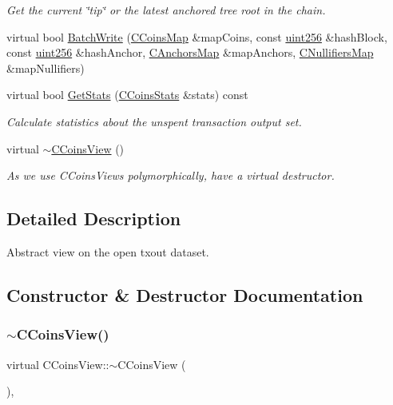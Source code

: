 \begin{DoxyCompactItemize}
\begin{DoxyCompactList}\small\item\em Get the current \char`\"{}tip\char`\"{} or the latest anchored tree root in the chain. \end{DoxyCompactList}\item 
virtual bool \mbox{\hyperlink{class_c_coins_view_a6e0ef2f996f5bf9f15c4fcae89333c7d}{Batch\+Write}} (\mbox{\hyperlink{coins_8h_a2886ba2fd0428bae777e1cbcabc02834}{C\+Coins\+Map}} \&map\+Coins, const \mbox{\hyperlink{classuint256}{uint256}} \&hash\+Block, const \mbox{\hyperlink{classuint256}{uint256}} \&hash\+Anchor, \mbox{\hyperlink{coins_8h_a070827cc9d21a91b8f4f4f52a6f7c848}{C\+Anchors\+Map}} \&map\+Anchors, \mbox{\hyperlink{coins_8h_ab651cc287e9594190ef77d2fca2b14c7}{C\+Nullifiers\+Map}} \&map\+Nullifiers)
\item 
virtual bool \mbox{\hyperlink{class_c_coins_view_adbd7f73ba071c6e441dd88d95b8f2c0d}{Get\+Stats}} (\mbox{\hyperlink{struct_c_coins_stats}{C\+Coins\+Stats}} \&stats) const
\begin{DoxyCompactList}\small\item\em Calculate statistics about the unspent transaction output set. \end{DoxyCompactList}\item 
virtual \mbox{\hyperlink{class_c_coins_view_a7ffb4218bf991ddff47339e44c8710da}{$\sim$\+C\+Coins\+View}} ()
\begin{DoxyCompactList}\small\item\em As we use C\+Coins\+Views polymorphically, have a virtual destructor. \end{DoxyCompactList}\end{DoxyCompactItemize}


\subsection{Detailed Description}
Abstract view on the open txout dataset. 

\subsection{Constructor \& Destructor Documentation}
\mbox{\label{class_c_coins_view_a7ffb4218bf991ddff47339e44c8710da}} 
\subsubsection{\texorpdfstring{$\sim$\+C\+Coins\+View()}{~CCoinsView()}}
{\footnotesize\ttfamily virtual C\+Coins\+View\+::$\sim$\+C\+Coins\+View (\begin{DoxyParamCaption}{ }\end{DoxyParamCaption})\hspace{0.3cm}{\ttfamily [inline]}, {\ttfamily [virtual]}}



